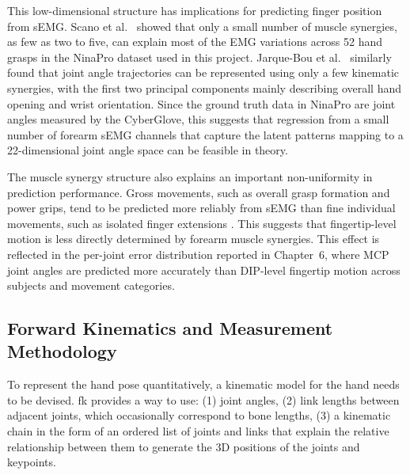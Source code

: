 \documentclass[11pt]{article}
\begin{document}
This low-dimensional structure has implications for predicting finger position from sEMG. Scano et al.\ \cite{scano2018muscle} showed that only a small number of muscle synergies, as few as two to five, can explain most of the EMG variations across 52 hand grasps in the NinaPro dataset used in this project. Jarque-Bou et al.\ \cite{jarquebou2019kinematic} similarly found that joint angle trajectories can be represented using only a few kinematic synergies, with the first two principal components mainly describing overall hand opening and wrist orientation. Since the ground truth data in NinaPro are joint angles measured by the CyberGlove, this suggests that regression from a small number of forearm sEMG channels that capture the latent patterns mapping to a 22-dimensional joint angle space can be feasible in theory.

The muscle synergy structure also explains an important non-uniformity in prediction performance. Gross movements, such as overall grasp formation and power grips, tend to be predicted more reliably from sEMG than fine individual movements, such as isolated finger extensions \cite{jarquebou2019kinematic,pale2020variability}. This suggests that fingertip-level motion is less directly determined by forearm muscle synergies. This effect is reflected in the per-joint error distribution reported in Chapter~6, where MCP joint angles are predicted more accurately than DIP-level fingertip motion across subjects and movement categories.

\subsection{Forward Kinematics and Measurement Methodology}
\label{sec:fk}
To represent the hand pose quantitatively, a kinematic model for the hand needs to be devised. \gls{fk} provides a way to use: (1) joint angles, (2) link lengths between adjacent joints, which occasionally correspond to bone lengths, (3) a kinematic chain in the form of an ordered list of joints and links that explain the relative relationship between them to generate the 3D positions of the joints and keypoints.
\end{document}
